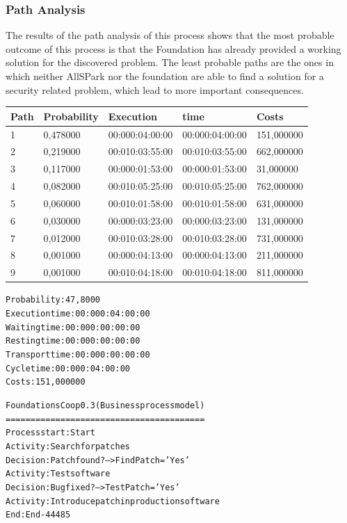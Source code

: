 \subsubsection{Path Analysis}
The results of the path analysis of this process shows that the most
probable outcome of this process is that the Foundation has already
provided a working solution for the discovered problem.
The least probable paths are the ones in which neither AllSPark nor the
foundation are able to find a solution for a security related problem,
which lead to more important consequences.

\begin{table}[ht!]
\centering
\begin{tabular}{|l|l|l|l|l|}
\hline
Path&Probability&Execution&time&Costs\\
\hline
1&0,478000&00:000:04:00:00&00:000:04:00:00&151,000000\\
\hline
2&0,219000&00:010:03:55:00&00:010:03:55:00&662,000000\\
\hline
3&0,117000&00:000:01:53:00&00:000:01:53:00&31,000000\\
\hline
4&0,082000&00:010:05:25:00&00:010:05:25:00&762,000000\\
\hline
5&0,060000&00:010:01:58:00&00:010:01:58:00&631,000000\\
\hline
6&0,030000&00:000:03:23:00&00:000:03:23:00&131,000000\\
\hline
7&0,012000&00:010:03:28:00&00:010:03:28:00&731,000000\\
\hline
8&0,001000&00:000:04:13:00&00:000:04:13:00&211,000000\\
\hline
9&0,001000&00:010:04:18:00&00:010:04:18:00&811,000000\\
\hline
\end{tabular}
\end{table}

\begin{alltt}
Probability:   47,8000%
Execution time:  00:000:04:00:00
Waiting time:  00:000:00:00:00
Resting time:  00:000:00:00:00
Transport time:  00:000:00:00:00
Cycle time:  00:000:04:00:00
Costs:  151,000000

Foundations Coop 0.3 (Business process model)
========================================
Process start: Start
Activity: Search for patches
Decision: Patch found? --> FindPatch = 'Yes'
Activity: Test software
Decision: Bug fixed? --> TestPatch = 'Yes'
Activity: Introduce patch in production software
End: End-44485
\end{alltt}

